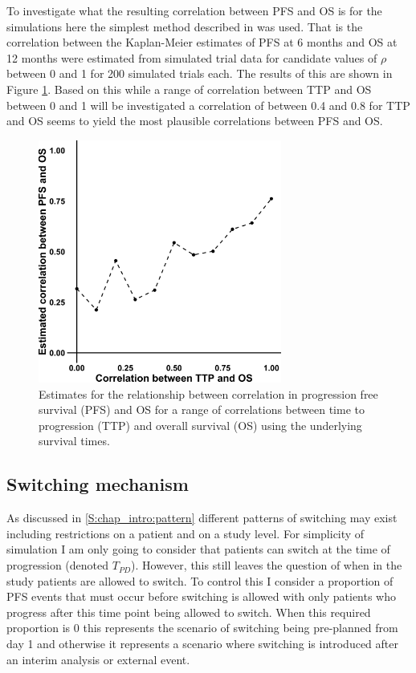 To investigate what the resulting correlation between PFS and OS is for the simulations here the simplest method described in \cite{Buyse2007} was used. That is the correlation between the Kaplan-Meier estimates of PFS at 6 months and OS at 12 months were estimated from simulated trial data for candidate values of $\rho$ between 0 and 1 for 200 simulated trials each. The results of this are shown in Figure \ref{F:chap_sim_design:pfs_corr}. Based on this while a range of correlation between TTP and OS between 0 and 1 will be investigated a correlation of between 0.4 and 0.8 for TTP and OS seems to yield the most plausible correlations between PFS and OS.

\clearpage

\begin{figure}[h!]
\centering
\includegraphics[width=8cm]{images/chap_simdesign/PFSOScor.png}
\caption{\label{F:chap_sim_design:pfs_corr} Estimates for the relationship between correlation in progression free survival (PFS) and OS for a range of correlations between time to progression (TTP) and overall survival (OS) using the underlying survival times.} 
\end{figure}


\subsection{Switching mechanism}
\label{S:chap_sim_design:switchmec}
As discussed in \ref{S:chap_intro:pattern} different patterns of switching may exist including restrictions on a patient and on a study level. For simplicity of simulation I am only going to consider that patients can switch at the time of progression (denoted $T_{PD}$). However, this still leaves the question of when in the study patients are allowed to switch. To control this I consider a proportion of PFS events that must occur before switching is allowed with only patients who progress after this time point being allowed to switch. When this required proportion is 0 this represents the scenario of switching being pre-planned from day 1 and otherwise it represents a scenario where switching is introduced after an interim analysis or external event.


